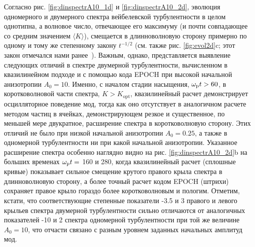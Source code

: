 Согласно рис. \ref{fig:dinspectrA10_1d} и \ref{fig:dinspectrA10_2d}, эволюция одномерного и двумерного спектра вейбелевской турбулентности в целом однотипна, а волновое число, отвечающее его максимуму (и почти совпадающее со средним значением $\langle K\rangle$), смещается в длинноволновую сторону примерно по одному и тому же степенному закону $t^{-1/2}$ (см. также рис. \ref{fig:evol2d}c; этот закон отмечался нами ранее~\cite{Borodachev2016_Radiofiz,Nechaev2019_Radiophys}). Важным, однако, представляется выявление следующих отличий в спектре двумерной турбулентности, вычисленном в квазилинейном подходе и с помощью кода EPOCH при высокой начальной анизотропии $A_0=10$. Именно, с началом стадии насыщения, $\omega_\mathrm{p} t > 60$, в коротковолновой части спектра, $K > K_\mathrm{opt}$, квазилинейный расчет демонстрирует осцилляторное поведение мод, тогда как оно отсутствует в аналогичном расчете методом частиц в ячейках, демонстрирующем резкое и существенное, по меньшей мере двукратное, расширение спектра в коротковолновую сторону. Этих отличий не было при низкой начальной анизотропии $A_0=0.25$, а также в одномерной турбулентности ни при какой начальной анизотропии. Указанное расширение спектра особенно наглядно видно на рис. \ref{fig:dinspectrA10_2d}b на больших временах $\omega_\mathrm{p} t =$ 160 и 280, когда квазилинейный расчет (сплошные кривые) показывает сильное смещение крутого правого крыла спектра в длинноволновую сторону, а более точный расчет кодом EPOCH (штрихи) сохраняет правое крыло гораздо более коротковолновым и пологим. Отметим, кстати, что соответствующие степенные показатели -3.5 и 3 правого и левого крыльев спектра двумерной турбулентности сильно отличаются от аналогичных показателей -10 и 2 спектра одномерной турбулентности при той же величине $A_0=10$, что отчасти связано с разным уровнем заданных начальных амплитуд мод. 




